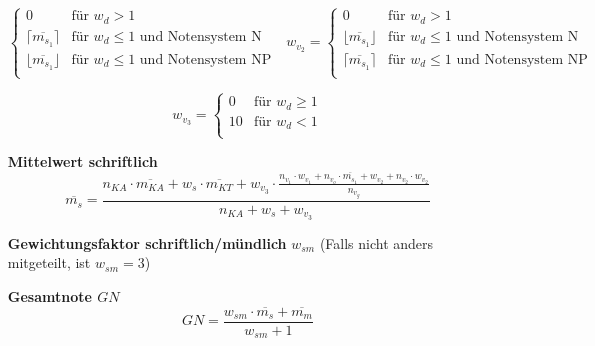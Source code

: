 \documentclass{article}
\begin{document}
\begin{enumerate}[label=\textbf{\textbullet}, align=left, leftmargin=*]
\[\begin{cases}
		0 & \text{für }  w_{d} > 1 \\
		\lceil \overline{m_{s_1}} \rceil & \text{für }    w_{d} \leq 1 \text{ und Notensystem N} \\
		\lfloor \overline{m_{s_1}} \rfloor & \text{für }    w_{d} \leq 1 \text{ und Notensystem NP} \\
	\end{cases}
	\,\,\,\,
	w_{v_2} =
	\begin{cases}
		0 & \text{für }  w_{d} > 1 \\
		\lfloor \overline{m_{s_1}} \rfloor & \text{für }    w_{d} \leq 1 \text{ und Notensystem N} \\
		\lceil \overline{m_{s_1}} \rceil & \text{für }    w_{d} \leq 1 \text{ und Notensystem NP} \\
	\end{cases}
	\]
	
	\[
	w_{v_3} =
	\begin{cases}
		0 & \text{für }  w_{d} \geq 1 \\
		10 & \text{für }    w_{d} < 1 \\
	\end{cases}
	\]	
	\item[\textbf{Mittelwert schriftlich}]
	\[
	\overline{m_{s}} = \frac{ n_{KA} \cdot \overline{m_{KA}} + w_s \cdot \overline{m_{KT}} +w_{v_3} \cdot  \frac{n_{v_1} \cdot w_{v_1} + n_{v_o} \cdot \overline{m_{s_1}} + w_{v_2} + n_{v_2} \cdot w_{v_2}}{n_{v_g}}  }{n_{KA} + w_s + w_{v_3}}
	\]
	\item[\textbf{Gewichtungsfaktor schriftlich/mündlich}] $w_{sm}$ (Falls nicht anders mitgeteilt, ist $w_{sm}=3$)
	\item[\textbf{Gesamtnote $GN$}]
	\[
	GN = \frac{w_{sm} \cdot \overline{m_{s}} + \overline{m_{m}}}{w_{sm}+1}
	\]
\end{enumerate}
	
\end{document}
